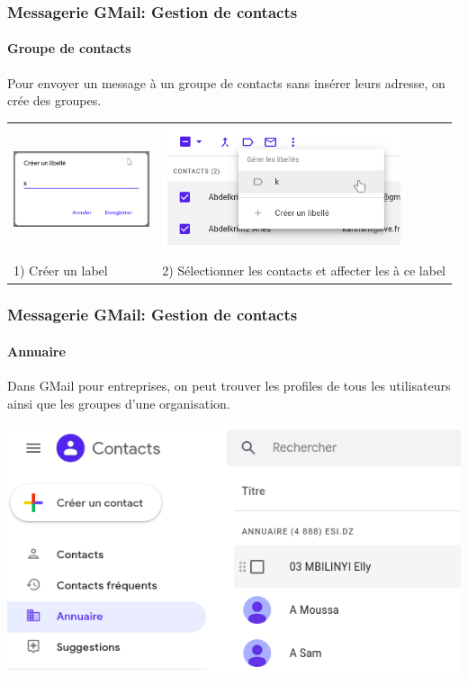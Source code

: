 \documentclass{beamer}
\begin{document}
\begin{frame}
\frametitle{Messagerie GMail: Gestion de contacts}
\framesubtitle{Groupe de contacts}

Pour envoyer un message à un groupe de contacts sans insérer leurs adresse, on crée des groupes.

\begin{tabular}{p{4.1cm}p{7.1cm}}
	\includegraphics[width=4cm]{..//img/Bweb02-ri-gmail/gmail-contacts-label1.png} & 
	\includegraphics[width=7cm]{..//img/Bweb02-ri-gmail/gmail-contacts-label2.png} \\
	
	1) Créer un label & 
	2) Sélectionner les contacts et affecter les à ce label
	
\end{tabular}

\end{frame}


\begin{frame}
\frametitle{Messagerie GMail: Gestion de contacts}
\framesubtitle{Annuaire}

Dans GMail pour entreprises, on peut trouver les profiles de tous les utilisateurs ainsi que les groupes d'une organisation. 

\begin{center}
	\includegraphics[height=.6\textheight]{..//img/Bweb02-ri-gmail/gmail-annuaire.png}
\end{center}


\end{frame}
\end{document}
